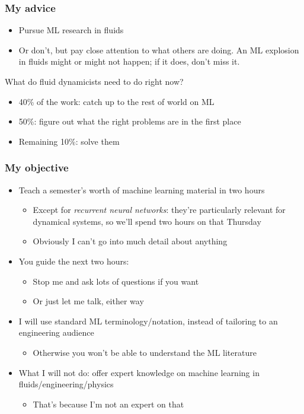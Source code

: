 \begin{frame}
    \frametitle{My advice}

    \begin{itemize}
        \item Pursue ML research in fluids
        \item Or don't, but pay close attention to what others are doing.
        An ML explosion in fluids might or might not happen; if it does, don't miss it.
    \end{itemize}

    \begin{block}{What do fluid dynamicists need to do right now?}
        \begin{itemize}
            \item 40\% of the work: catch up to the rest of world on ML
            \item 50\%: figure out \alert{what the right problems are} in the first place
            \item Remaining 10\%: solve them
        \end{itemize}
    \end{block}
\end{frame}

\begin{frame}
    \frametitle{My objective}

    \begin{itemize}
        \item Teach a semester's worth of machine learning material in two hours
        \begin{itemize}
            \item Except for \emph{recurrent neural networks}: they're particularly relevant for dynamical systems, so we'll spend two hours on that Thursday
            \item Obviously I can't go into much detail about anything
        \end{itemize}
        \item You guide the next two hours:
        \begin{itemize}
            \item Stop me and ask lots of questions if you want \smiley
            \item Or just let me talk, either way
        \end{itemize}
        \item I will use standard ML terminology/notation, instead of tailoring to an engineering audience
        \begin{itemize}
            \item Otherwise you won't be able to understand the ML literature
        \end{itemize}
        \item What I will not do: offer expert knowledge on machine learning in fluids/engineering/physics
        \begin{itemize}
            \item That's because I'm not an expert on that
        \end{itemize}
    \end{itemize}
\end{frame}

